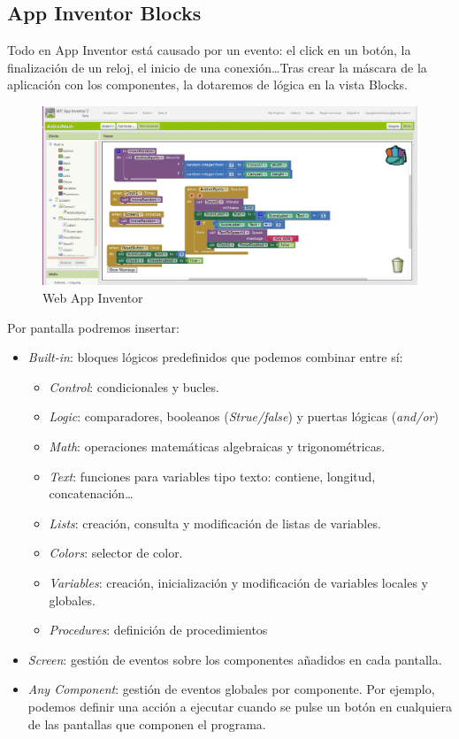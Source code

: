 \documentclass[a4paper, 12pt]{book}
\begin{document}
\subsection{App Inventor Blocks} 
Todo en App Inventor está causado por un evento: el click en un botón, la finalización de un reloj, el inicio de una conexión\ldots Tras crear la máscara de la aplicación con los componentes, la dotaremos de lógica en la vista Blocks. 
\begin{figure}[H]
  \centering
  \includegraphics[width=\linewidth, keepaspectratio]{img/appBlock}
  \caption{Web App Inventor}
  \label{fig:appinventorgallery}
\end{figure}
Por pantalla podremos insertar: 
\begin{itemize}	
	\item \textit{Built-in}: bloques lógicos predefinidos que podemos combinar entre sí:
		\begin{itemize}	
		\item \textit{Control}: condicionales y bucles.
		\item \textit{Logic}: comparadores, booleanos (\textit{Strue/false}) y puertas lógicas (\textit{and/or})	
		\item \textit{Math}: operaciones matemáticas algebraicas y trigonométricas.	
		\item \textit{Text}: funciones para variables tipo texto: contiene, longitud, concatenación\ldots	
		\item \textit{Lists}: creación, consulta y modificación de listas de variables. 	
		\item \textit{Colors}: selector de color.
		\item \textit{Variables}: creación, inicialización y modificación de variables locales y globales.
		\item \textit{Procedures}: definición de procedimientos
		\end{itemize}
	\item \textit{Screen}: gestión de eventos sobre los componentes añadidos en cada pantalla. 
	\item \textit{Any Component}: gestión de eventos globales por componente. Por ejemplo, podemos definir una acción a ejecutar cuando se pulse un botón en cualquiera de las pantallas que componen el programa.  

\end{itemize}
\end{document}
